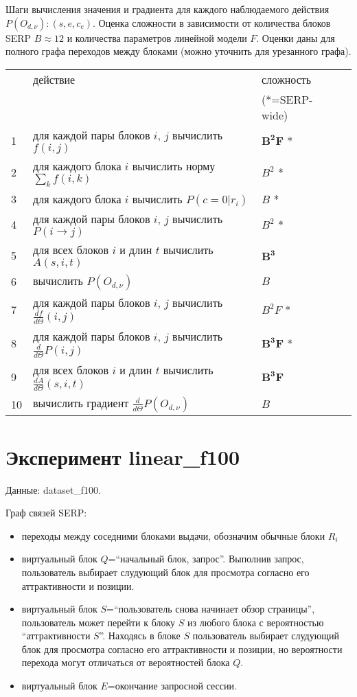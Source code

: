 \documentclass[12pt,a4paper]{article}
\begin{document}
Шаги вычисления значения и градиента для каждого наблюдаемого действия $P(O_{d,\nu}): (s,e,c_e)$. Оценка сложности в зависимости от количества блоков SERP $B \approx 12$ и количества параметров линейной модели $F$. Оценки даны для полного графа переходов между блоками (можно уточнить для урезанного графа).

\begin{tabular}{|l|l|l|l|}
\hline
 & действие & сложность \\
 &          & (*=SERP-wide) \\
\hline
1 & для каждой пары блоков $i$, $j$ вычислить $f(i,j)$     & $\mathbf{B^2 F}$ * \\
2 & для каждого блока $i$ вычислить норму $\sum_k f(i, k)$ & $B^2$   * \\
3 & для каждого блока $i$ вычислить $P(c=0|r_i)$           & $B$     * \\
4 & для каждой пары блоков $i$, $j$ вычислить $P(i \to j)$ & $B^2$   * \\
5 & для всех блоков $i$ и длин $t$ вычислить $A(s,i,t)$    & $\mathbf{B^3}$ \\
6 & вычислить $P(O_{d,\nu})$                               & $B$ \\
\hline
7 & для каждой пары блоков $i$, $j$ вычислить $\frac{df}{d\Theta}(i,j)$ & $B^2 F$ * \\
8 & для каждой пары блоков $i$, $j$ вычислить $\frac{d}{d\Theta}P(i,j)$ & $\mathbf{B^3 F}$ * \\
9 & для всех блоков $i$ и длин $t$ вычислить $\frac{dA}{d\Theta}(s,i,t)$ & $\mathbf{B^3 F}$ \\
10 & вычислить градиент $\frac{d}{d\Theta}P(O_{d,\nu})$ & $B$ \\
\hline
\end{tabular}


\section{Эксперимент linear\_f100}

Данные: dataset\_f100.

Граф связей SERP:
\begin{itemize}
 \item переходы между соседними блоками выдачи, обозначим обычные блоки $R_i$
 \item виртуальный блок $Q$=``начальный блок, запрос''. Выполнив запрос, пользователь  выбирает слудующий блок для просмотра согласно его аттрактивности и позиции.
 \item виртуальный блок $S$=``пользователь снова начинает обзор страницы'', пользователь может перейти к блоку $S$ из любого блока с вероятностью ``аттрактивности $S$''. Находясь в блоке $S$ пользователь выбирает слудующий блок для просмотра согласно его аттрактивности и позиции, но вероятности перехода могут отличаться от вероятностей блока $Q$.
 \item виртуальный блок $E$=окончание запросной сессии.
\end{itemize}
\end{document}
